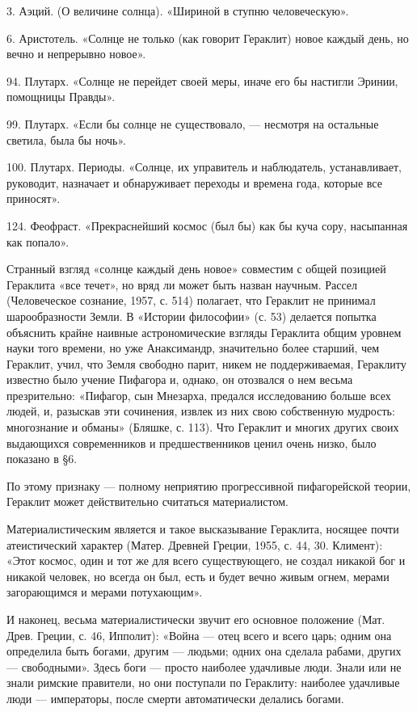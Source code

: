3. Аэций. (О величине солнца). «Шириной в ступню человеческую».

6. Аристотель. «Солнце  не только (как говорит  Гераклит) новое каждый
день, но вечно и непрерывно новое».

94. Плутарх.  «Солнце не  перейдет своей меры,  иначе его  бы настигли
Эринии, помощницы Правды».

99.  Плутарх.  «Если  бы  солнце  не  существовало,  ---  несмотря  на
остальные светила, была бы ночь».

100.  Плутарх.   Периоды.  «Солнце,   их  управитель   и  наблюдатель,
устанавливает, руководит, назначает и  обнаруживает переходы и времена
года, которые все приносят».

124.  Феофраст.  «Прекраснейший космос  (был  бы)  как бы  куча  сору,
насыпанная как попало».

Странный взгляд «солнце каждый день  новое» совместим с общей позицией
Гераклита «все  течет», но вряд  ли может быть назван  научным. Рассел
(Человеческое  сознание,  1957,  с.  514) полагает,  что  Гераклит  не
принимал шарообразности Земли. В  «Истории философии» (с. 53) делается
попытка  объяснить крайне  наивные  астрономические взгляды  Гераклита
общим  уровнем науки  того  времени, но  уже Анаксимандр,  значительно
более старший, чем Гераклит, учил,  что Земля свободно парит, никем не
поддерживаемая, Гераклиту известно было  учение Пифагора и, однако, он
отозвался о нем весьма  презрительно: «Пифагор, сын Мнезарха, предался
исследованию больше всех  людей, и, разыскав эти  сочинения, извлек из
них  свою  собственную мудрость:  многознание  и  обманы» (Бляшке,  с.
113). Что  Гераклит и многих  других своих выдающихся  современников и
предшественников ценил очень низко, было показано в §6.

По этому  признаку ---  полному неприятию  прогрессивной пифагорейской
теории, Гераклит может действительно считаться материалистом.

Материалистическим  является и  такое высказывание  Гераклита, носящее
почти атеистический характер (Матер. Древней  Греции, 1955, с. 44, 30.
Климент):  «Этот космос,  один и  тот же  для всего  существующего, не
создал никакой бог  и никакой человек, но всегда он  был, есть и будет
вечно живым огнем, мерами загорающимся и мерами потухающим».

И  наконец, весьма  материалистически  звучит  его основное  положение
(Мат. Древ.  Греции, с. 46,  Ипполит): «Война  --- отец всего  и всего
царь; одним она  определила быть богами, другим ---  людьми; одних она
сделала рабами, других --- свободными». Здесь боги --- просто наиболее
удачливые люди. Знали или не знали римские правители, но они поступали
по  Гераклиту: наиболее  удачливые люди  --- императоры,  после смерти
автоматически делались богами.

